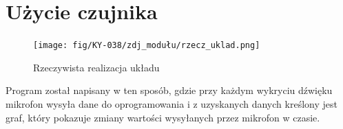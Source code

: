 \documentclass[11pt, a4paper]{article}
\begin{document}
\newpage

\section{Użycie czujnika}

\vspace{0.25cm}

\begin{figure}[H]
    \centering
    \texttt{[image: fig/KY-038/zdj\_modułu/rzecz\_uklad.png]}
    \caption{Rzeczywista realizacja układu}
    \label{fig:my_label}
\end{figure}

Program został napisany w ten sposób, gdzie przy każdym wykryciu dźwięku mikrofon wysyła dane do oprogramowania i z uzyskanych danych kreślony jest graf, który pokazuje zmiany wartości wysyłanych przez mikrofon w czasie.

\newpage

\printbibliography[heading=bibintoc]
\end{document}
